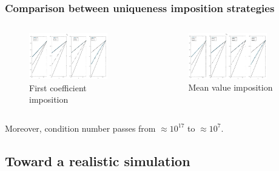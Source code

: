 \documentclass[8pt]{beamer}
\begin{document}
\begin{frame}
	\frametitle{Comparison between uniqueness imposition strategies}
	\begin{columns}
		\begin{column}{0.5\textwidth}
			\begin{figure}[h]
				\includegraphics[width=0.8\textwidth]{D1_Vm_1.jpg} \caption{First coefficient imposition}
			\end{figure}
		\end{column}
		\begin{column}{0.5\textwidth}
			\begin{figure}[h]
				\includegraphics[width=0.8\textwidth]{D1_Vm_2.jpg} \caption{Mean value imposition}
			\end{figure}
		\end{column}
	\end{columns}
	\vspace{3mm}
	\begin{center}
	Moreover, condition number passes from $\approx 10^{17}$ to $\approx 10^7$.
	\end{center}
\end{frame}

\subsection{Toward a realistic simulation}
\end{document}
